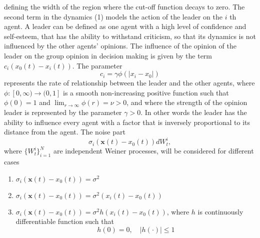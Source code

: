 defining the width of the region where the cut-off function decays to zero.
The second term in the dynamics (1) models the action of the leader on the $i$ th agent. A leader can be defined as one agent with a high level of confidence and self-esteem, 
that has the ability to withstand criticism, so that its dynamics is not influenced by the other agents' opinions. The influence of the opinion of the leader on the group opinion 
in decision making is given by the term $c_i\left(x_0(t)-x_i(t)\right)$. The parameter
$$
c_i=\gamma \phi\left(|x_i-x_0|\right)
$$
represents the rate of relationship between the leader and the other agents, 
where $\phi:[0, \infty) \rightarrow(0,1]$ is a smooth non-increasing positive function 
such that $\phi(0)=1$ and $\lim _{r \rightarrow \infty} \phi(r)=\nu > 0$, and where the strength of the opinion 
leader is represented by the parameter $\gamma>0$. In other words the leader has the ability to influence every agent with a factor that is inversely 
proportional to its distance from the agent. The noise part
\[
    \sigma_i(\mathbf{x}(t) - x_0(t)) dW^i_t, 
\]
where $\{W^i_t\}_{i=1}^N$ are independent Weiner processes,  will be considered for different cases
\begin{enumerate}
    \item $\sigma_i(\mathbf{x}(t) - x_0(t)) = \sigma^2$
    \item $\sigma_i(\mathbf{x}(t) - x_0(t)) = \sigma^2(x_i(t) - x_0(t))$
    \item $\sigma_i(\mathbf{x}(t) - x_0(t)) = \sigma^2 h(x_i(t) - x_0(t))$, where $h$ is continuously differentiable function such that 
    \[
        h(0) = 0, \quad |h(\cdot)| \leq 1
    \]
\end{enumerate}